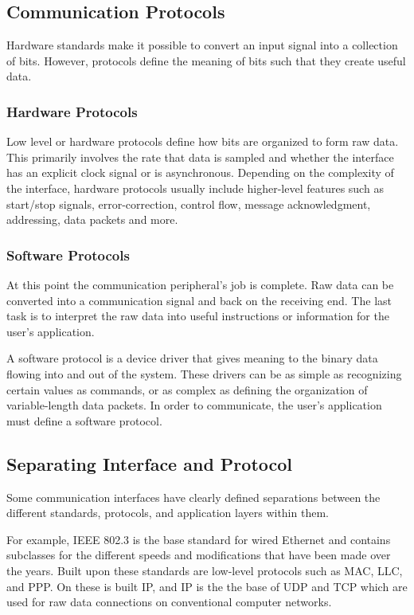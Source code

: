 \documentclass[11pt,fleqn]{book} %
\begin{document}
\subsection{Communication Protocols}
Hardware standards make it possible to convert an input signal into a collection of bits. However, protocols define the meaning of bits such that they create useful data. 

\subsubsection{Hardware Protocols}
Low level or hardware protocols define how bits are organized to form raw data. This primarily involves the rate that data is sampled and whether the interface has an explicit clock signal or is asynchronous.
Depending on the complexity of the interface, hardware protocols usually include higher-level features such as start/stop signals, error-correction, control flow, message acknowledgment, addressing, data packets and more.

\subsubsection{Software Protocols}	
At this point the communication peripheral's job is complete. Raw data can be converted into a communication signal and back on the receiving end. The last task is to interpret the raw data into useful instructions or information for the user's application.

A software protocol is a device driver that gives meaning to the binary data flowing into and out of the system. These drivers can be as simple as recognizing certain values as commands, or as complex as defining the organization of variable-length data packets.  In order to communicate, the user's application must define a software protocol. 

\subsection{Separating Interface and Protocol}
   
Some communication interfaces have clearly defined separations between the different standards, protocols, and application layers within them. 

For example, IEEE 802.3 is the base standard for wired Ethernet and contains subclasses for the different speeds and modifications that have been made over the years. Built upon these standards are low-level protocols such as MAC, LLC, and PPP. On these is built IP, and IP is the the base of UDP and TCP which are used for raw data connections on conventional computer networks. 
\end{document}

